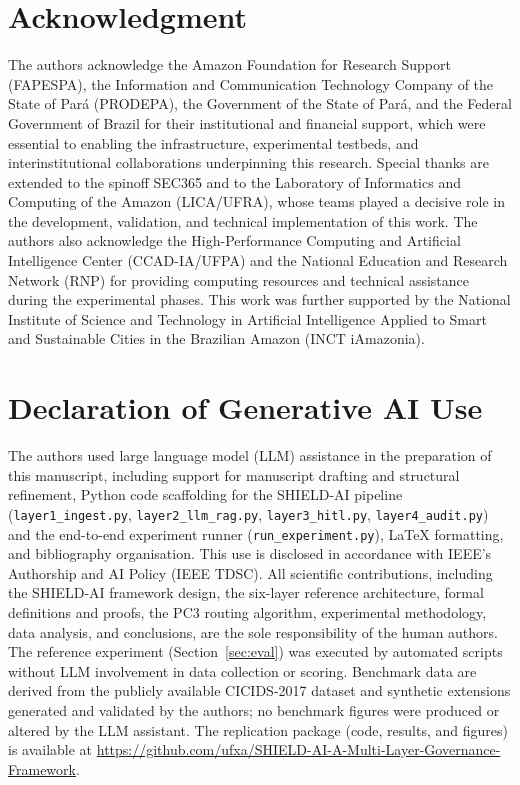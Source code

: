 \documentclass[journal]{IEEEtran}
\begin{document}
\section*{Acknowledgment}
The authors acknowledge the Amazon Foundation for Research Support (FAPESPA), the
Information and Communication Technology Company of the State of Pará (PRODEPA), the
Government of the State of Pará, and the Federal Government of Brazil for their
institutional and financial support, which were essential to enabling the infrastructure,
experimental testbeds, and interinstitutional collaborations underpinning this research.
Special thanks are extended to the spinoff SEC365 and to the Laboratory of
Informatics and Computing of the Amazon (LICA/UFRA), whose teams played a decisive role
in the development, validation, and technical implementation of this work.
The authors also acknowledge the High-Performance Computing and Artificial Intelligence
Center (CCAD-IA/UFPA) and the National Education and Research Network (RNP) for
providing computing resources and technical assistance during the experimental phases.
This work was further supported by the National Institute of Science and Technology in
Artificial Intelligence Applied to Smart and Sustainable Cities in the Brazilian Amazon
(INCT iAmazonia).

\section*{Declaration of Generative AI Use}
The authors used large language model (LLM) assistance in the preparation of this
manuscript, including support for manuscript drafting and structural refinement,
Python code scaffolding for the SHIELD-AI pipeline
(\texttt{layer1\_ingest.py}, \texttt{layer2\_llm\_rag.py}, \texttt{layer3\_hitl.py},
\texttt{layer4\_audit.py}) and the end-to-end experiment runner
(\texttt{run\_experiment.py}), \LaTeX{} formatting, and bibliography organisation.
This use is disclosed in accordance with IEEE's Authorship and AI Policy (IEEE TDSC).
All scientific contributions, including the SHIELD-AI framework design, the
six-layer reference architecture, formal definitions and proofs, the PC3 routing
algorithm, experimental methodology, data analysis, and conclusions, are the sole
responsibility of the human authors.
The reference experiment (Section~\ref{sec:eval}) was executed by automated scripts
without LLM involvement in data collection or scoring.
Benchmark data are derived from the publicly available CICIDS-2017 dataset and
synthetic extensions generated and validated by the authors; no benchmark figures
were produced or altered by the LLM assistant.
The replication package (code, results, and figures) is available at
\url{https://github.com/ufxa/SHIELD-AI-A-Multi-Layer-Governance-Framework}.



\end{document}
